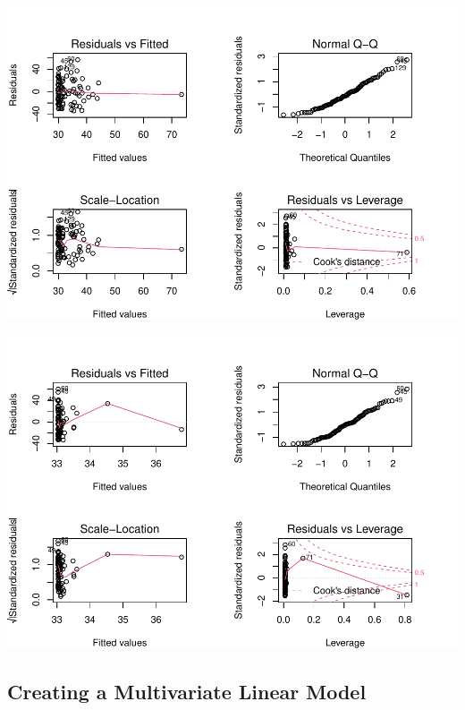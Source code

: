 \documentclass[
  12pt,
]{article}
\let\origfigure\figure
\let\endorigfigure\endfigure
\renewenvironment{figure}[1][2] {
    \expandafter\origfigure\expandafter[H]
} {
    \endorigfigure
}
\begin{document}
\begin{figure}
\centering
\includegraphics{CulbersonDeAngeliShapiro_ENV872_Project_files/figure-latex/unnamed-chunk-4-1.pdf}
\caption{Residuals from Central Bank Assets to GDP Regression}
\end{figure}

\begin{figure}
\centering
\includegraphics{CulbersonDeAngeliShapiro_ENV872_Project_files/figure-latex/unnamed-chunk-5-1.pdf}
\caption{Residuals from Total Reserves Regression}
\end{figure}

\newpage

\hypertarget{creating-a-multivariate-linear-model}{%
\subsection{Creating a Multivariate Linear
Model}\label{creating-a-multivariate-linear-model}}
\end{document}
